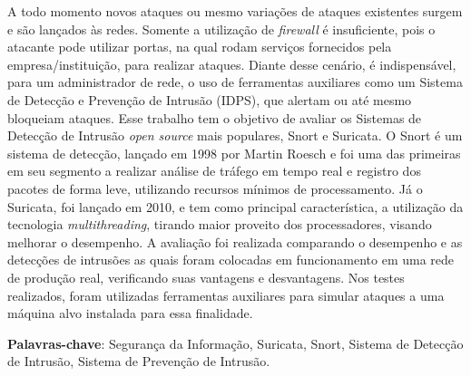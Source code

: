 \documentclass[
	12pt,				
	openright,		
	twoside,	
	a4paper,
	english,	
	brazil	
	]{abntex2}
\begin{document}
\setlength{\absparsep}{18pt} 

\begin{resumo}
 
A todo momento novos ataques ou mesmo variações de ataques existentes surgem e são lançados às redes. Somente a utilização de \textit{firewall} é insuficiente, pois o atacante pode utilizar portas, na qual rodam serviços fornecidos pela empresa/instituição, para realizar ataques. Diante desse cenário, é indispensável, para um administrador de rede, o uso de ferramentas auxiliares como um Sistema de Detecção e Prevenção de Intrusão (IDPS), que alertam ou até mesmo bloqueiam ataques. Esse trabalho tem o objetivo de avaliar os Sistemas de Detecção de Intrusão \textit{open source} mais populares, Snort e Suricata. O Snort é um sistema de detecção, lançado em 1998 por Martin Roesch e foi uma das primeiras em seu segmento a realizar análise de tráfego em tempo real e registro dos pacotes de forma leve, utilizando recursos mínimos de processamento. Já o Suricata, foi lançado em 2010, e tem como principal característica, a utilização da tecnologia \textit{multithreading}, tirando maior proveito dos processadores, visando melhorar o desempenho. A avaliação foi realizada comparando o desempenho e as detecções de intrusões as quais foram colocadas em funcionamento em uma rede de produção real, verificando suas vantagens e desvantagens. Nos testes realizados, foram utilizadas ferramentas auxiliares para simular ataques a uma máquina alvo instalada para essa finalidade. 

\textbf{Palavras-chave}: Segurança da Informação, Suricata, Snort, Sistema de Detecção de Intrusão, Sistema de Prevenção de Intrusão.
\end{resumo}
\end{document}
